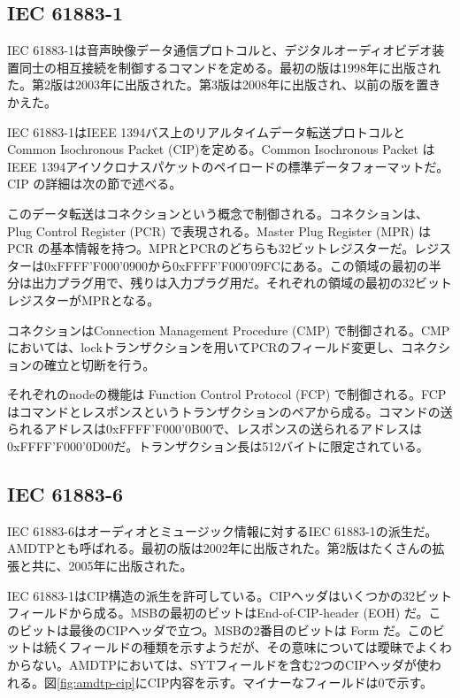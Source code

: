 \documentclass[onecolumn]{jarticle}
\begin{document}
\subsection{IEC 61883-1}

IEC 61883-1は音声映像データ通信プロトコルと、デジタルオーディオビデオ装置同士の相互接続を制御するコマンドを定める。最初の版は1998年に出版された\cite{iec61883-1-1}。第2版は2003年に出版された\cite{iec61883-1-2}。第3版は2008年に出版され、以前の版を置きかえた\cite{iec61883-1-3}。

IEC 61883-1はIEEE 1394バス上のリアルタイムデータ転送プロトコルとCommon Isochronous Packet (CIP)を定める。Common Isochronous Packet は IEEE 1394アイソクロナスパケットのペイロードの標準データフォーマットだ。CIP の詳細は次の節で述べる。

このデータ転送はコネクションという概念で制御される。コネクションは、Plug Control Register (PCR) で表現される。Master Plug Register (MPR) は PCR の基本情報を持つ。MPRとPCRのどちらも32ビットレジスターだ。レジスターは0xFFFF'F000'0900から0xFFFF'F000'09FCにある。この領域の最初の半分は出力プラグ用で、残りは入力プラグ用だ。それぞれの領域の最初の32ビットレジスターがMPRとなる。


コネクションはConnection Management Procedure (CMP) で制御される。CMPにおいては、lockトランザクションを用いてPCRのフィールド変更し、コネクションの確立と切断を行う。

それぞれのnodeの機能は Function Control Protocol (FCP) で制御される。FCPはコマンドとレスポンスというトランザクションのペアから成る。コマンドの送られるアドレスは0xFFFF'F000'0B00で、レスポンスの送られるアドレスは0xFFFF'F000'0D00だ。トランザクション長は512バイトに限定されている。


\subsection{IEC 61883-6}

IEC 61883-6はオーディオとミュージック情報に対するIEC 61883-1の派生だ。AMDTPとも呼ばれる。最初の版は2002年に出版された\cite{iec61883-6-1}。第2版はたくさんの拡張と共に、2005年に出版された\cite{iec61883-6-2}。

IEC 61883-1\cite{iec61883-1-1, iec61883-1-2, iec61883-1-3}はCIP構造の派生を許可している。CIPヘッダはいくつかの32ビットフィールドから成る。MSBの最初のビットはEnd-of-CIP-header (EOH) だ。このビットは最後のCIPヘッダで立つ。MSBの2番目のビットは Form だ。このビットは続くフィールドの種類を示すようだが、その意味については曖昧でよくわからない。AMDTPにおいては、SYTフィールドを含む2つのCIPヘッダが使われる。図\ref{fig:amdtp-cip}にCIP内容を示す。マイナーなフィールドは0で示す。
\end{document}
